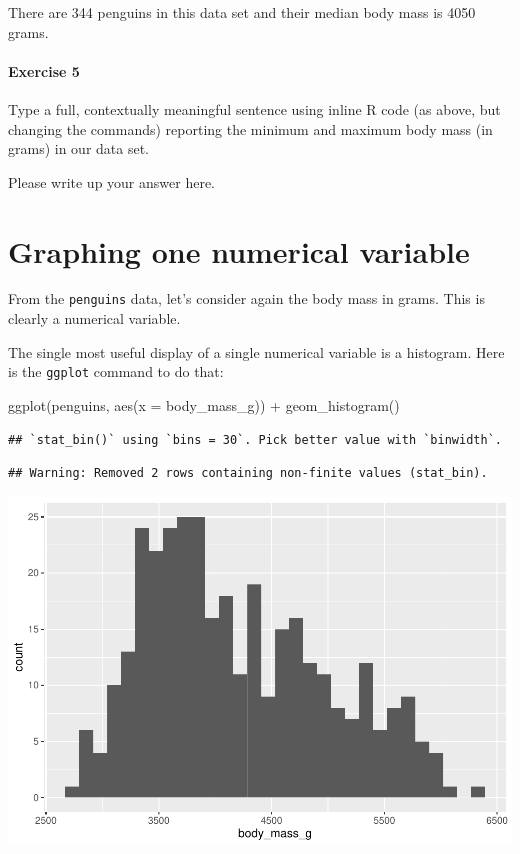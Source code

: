 \documentclass[
]{book}
\newenvironment{Shaded}{\begin{snugshade}}{\end{snugshade}}
\newcommand{\AttributeTok}[1]{\textcolor[rgb]{0.77,0.63,0.00}{#1}}
\newcommand{\FunctionTok}[1]{\textcolor[rgb]{0.00,0.00,0.00}{#1}}
\newcommand{\NormalTok}[1]{#1}
\newcommand{\SpecialCharTok}[1]{\textcolor[rgb]{0.00,0.00,0.00}{#1}}
\begin{document}
There are 344 penguins in this data set and their median body mass is 4050 grams.

\hypertarget{exercise-5-1}{%
\paragraph*{Exercise 5}\label{exercise-5-1}}

Type a full, contextually meaningful sentence using inline R code (as above, but changing the commands) reporting the minimum and maximum body mass (in grams) in our data set.

Please write up your answer here.

\hypertarget{numerical-graphing-one}{%
\section{Graphing one numerical variable}\label{numerical-graphing-one}}

From the \texttt{penguins} data, let's consider again the body mass in grams. This is clearly a numerical variable.

The single most useful display of a single numerical variable is a histogram. Here is the \texttt{ggplot} command to do that:

\begin{Shaded}
\begin{Highlighting}[]
\FunctionTok{ggplot}\NormalTok{(penguins, }\FunctionTok{aes}\NormalTok{(}\AttributeTok{x =}\NormalTok{ body\_mass\_g)) }\SpecialCharTok{+}
    \FunctionTok{geom\_histogram}\NormalTok{()}
\end{Highlighting}
\end{Shaded}

\begin{verbatim}
## `stat_bin()` using `bins = 30`. Pick better value with `binwidth`.
\end{verbatim}

\begin{verbatim}
## Warning: Removed 2 rows containing non-finite values (stat_bin).
\end{verbatim}

\includegraphics{intro_stats_files/figure-latex/unnamed-chunk-99-1.pdf}
\end{document}
